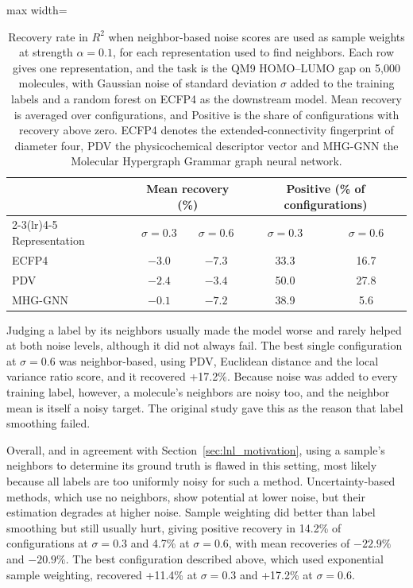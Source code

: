 \begin{table}[htbp]
\centering
\caption[Recovery with neighbor-based sample weights by representation.]{Recovery rate in $R^2$ when neighbor-based noise scores are used as sample weights at strength $\alpha = 0.1$, for each representation used to find neighbors. Each row gives one representation, and the task is the QM9 HOMO--LUMO gap on 5,000 molecules, with Gaussian noise of standard deviation $\sigma$ added to the training labels and a random forest on ECFP4 as the downstream model. Mean recovery is averaged over configurations, and Positive is the share of configurations with recovery above zero. ECFP4 denotes the extended-connectivity fingerprint of diameter four, PDV the physicochemical descriptor vector and MHG-GNN the Molecular Hypergraph Grammar graph neural network.}
\label{tab:code_input_neighbor_recovery}
\begin{adjustbox}{max width=\textwidth}
\begin{tabular}{lcccc}
\toprule
 & \multicolumn{2}{c}{Mean recovery (\%)} & \multicolumn{2}{c}{Positive (\% of configurations)} \\
\cmidrule(lr){2-3}\cmidrule(lr){4-5}
Representation & $\sigma = 0.3$ & $\sigma = 0.6$ & $\sigma = 0.3$ & $\sigma = 0.6$ \\
\midrule
ECFP4   & $-3.0$ & $-7.3$ & 33.3 & 16.7 \\
PDV     & $-2.4$ & $-3.4$ & 50.0 & 27.8 \\
MHG-GNN & $-0.1$ & $-7.2$ & 38.9 & 5.6 \\
\bottomrule
\end{tabular}
\end{adjustbox}
\end{table}

Judging a label by its neighbors usually made the model worse and rarely helped at both noise levels, although it did not always fail. The best single configuration at $\sigma = 0.6$ was neighbor-based, using PDV, Euclidean distance and the local variance ratio score, and it recovered +17.2\%. Because noise was added to every training label, however, a molecule's neighbors are noisy too, and the neighbor mean is itself a noisy target. The original study gave this as the reason that label smoothing failed.

Overall, and in agreement with Section~\ref{sec:lnl_motivation}, using a sample's neighbors to determine its ground truth is flawed in this setting, most likely because all labels are too uniformly noisy for such a method. Uncertainty-based methods, which use no neighbors, show potential at lower noise, but their estimation degrades at higher noise. Sample weighting did better than label smoothing but still usually hurt, giving positive recovery in 14.2\% of configurations at $\sigma = 0.3$ and 4.7\% at $\sigma = 0.6$, with mean recoveries of $-22.9\%$ and $-20.9\%$. The best configuration described above, which used exponential sample weighting, recovered +11.4\% at $\sigma = 0.3$ and +17.2\% at $\sigma = 0.6$.

